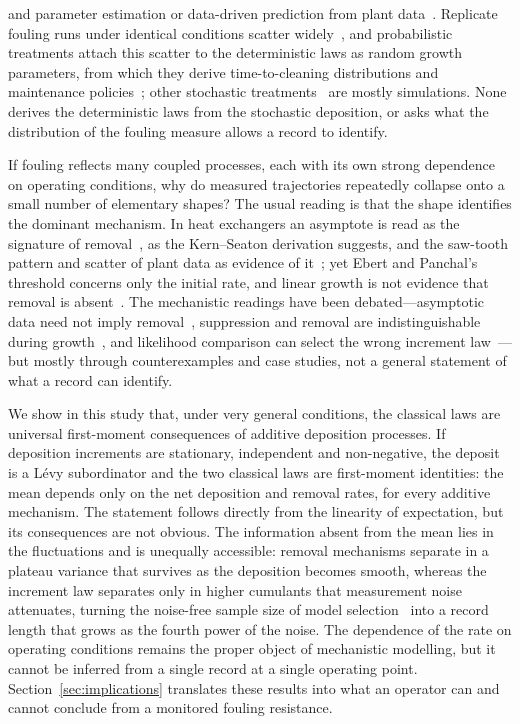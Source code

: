 \documentclass[preprint,12pt]{elsarticle}
\begin{document}
and parameter estimation or data-driven prediction from plant
data~\cite{LoyolaFuentes2019,LoyolaFuentesSmith2019,Markowski2025,Sundar2020}.
Replicate fouling runs under identical conditions scatter
widely~\cite{Zubair1997CaCO3}, and probabilistic treatments attach this scatter
to the deterministic laws as random growth parameters, from which they derive
time-to-cleaning distributions and maintenance
policies~\cite{Zubair1992,Zubair1997,Zubair2000,Sheikh2001}; other stochastic
treatments~\cite{Vatistas1988,Flora1993,Wessling2001,Liu2020} are mostly
simulations. None derives the deterministic laws from the
stochastic deposition, or asks what the distribution of the fouling measure
allows a record to identify.

If fouling reflects many coupled processes, each with its own strong
dependence on operating conditions, why do measured trajectories repeatedly
collapse onto a small number of elementary shapes? The usual reading is that
the shape identifies the dominant mechanism. In heat
exchangers an asymptote is read as the signature of removal~\cite{Shaikh2023,Fguiri2020}, as the
Kern--Seaton derivation suggests, and the saw-tooth pattern and scatter of
plant data as evidence of it~\cite{Crittenden1992}; yet Ebert and Panchal's
threshold concerns only the initial rate, and linear growth is not evidence
that removal is absent~\cite{EbertPanchal1997,Wilson24052017}.
The mechanistic readings have been debated---asymptotic data need not imply
removal~\cite{Epstein1983}, suppression and removal are indistinguishable
during growth~\cite{Diaz-Bejarano24052017}, and likelihood comparison can
select the wrong increment law~\cite{ZhangRevie2016}---but mostly through
counterexamples and case studies, not a general statement of what a record
can identify.

We show in this study that, under very general conditions, 
the classical laws are universal first-moment consequences of additive deposition processes.
If deposition increments are stationary,
independent and non-negative, the deposit is a L\'evy subordinator and the two
classical laws are first-moment identities: the mean depends only on the net
deposition and removal rates, for every additive mechanism. The statement
follows directly from the linearity of expectation, but its consequences are
not obvious. The information absent
from the mean lies in the fluctuations and is unequally accessible: removal
mechanisms separate in a plateau variance that survives as the deposition
becomes smooth, whereas the increment law separates only in higher cumulants
that measurement noise attenuates, turning the noise-free sample size of
model selection~\cite{ZhangRevie2016} into a record length that grows as the
fourth power of the noise. The dependence of the rate on operating conditions
remains the proper object of mechanistic modelling, but it cannot be inferred
from a single record at a single operating point.
Section~\ref{sec:implications} translates these results into what an
operator can and cannot conclude from a monitored fouling resistance.
\end{document}
